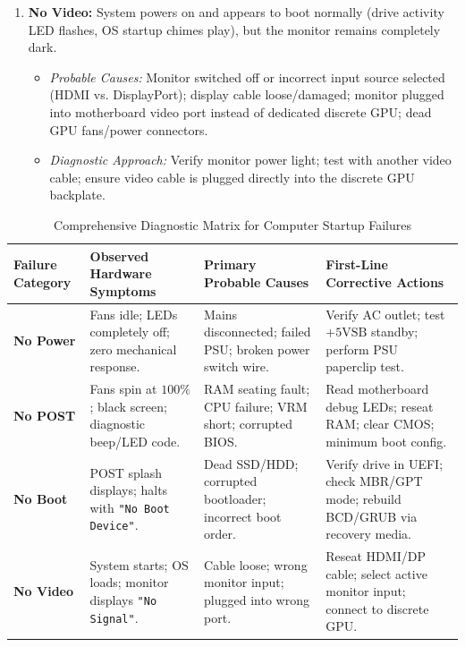 \begin{enumerate}[label=\bfseries\arabic*.]
\begin{itemize}
        \item \textit{Diagnostic Approach:} Enter UEFI Setup; verify if physical SSD is detected under SATA/NVMe drive lists; check boot order priorities; repair Windows BCD or GRUB2 bootloader via recovery USB.
    \end{itemize}
    \item \textbf{No Video:} System powers on and appears to boot normally (drive activity LED flashes, OS startup chimes play), but the monitor remains completely dark.
    \begin{itemize}
        \item \textit{Probable Causes:} Monitor switched off or incorrect input source selected (HDMI vs. DisplayPort); display cable loose/damaged; monitor plugged into motherboard video port instead of dedicated discrete GPU; dead GPU fans/power connectors.
        \item \textit{Diagnostic Approach:} Verify monitor power light; test with another video cable; ensure video cable is plugged directly into the discrete GPU backplate.
    \end{itemize}
\end{enumerate}

\begin{table}[htbp]
\centering
\small
\caption{Comprehensive Diagnostic Matrix for Computer Startup Failures}
\label{tab:startup_troubleshooting_matrix}
\begin{tabularx}{\textwidth}{l X X X}
\toprule
\textbf{Failure Category} & \textbf{Observed Hardware Symptoms} & \textbf{Primary Probable Causes} & \textbf{First-Line Corrective Actions} \\
\midrule
\textbf{No Power} & Fans idle; LEDs completely off; zero mechanical response. & Mains disconnected; failed PSU; broken power switch wire. & Verify AC outlet; test $+5\text{VSB}$ standby; perform PSU paperclip test. \\
\textbf{No POST} & Fans spin at $100\%$; black screen; diagnostic beep/LED code. & RAM seating fault; CPU failure; VRM short; corrupted BIOS. & Read motherboard debug LEDs; reseat RAM; clear CMOS; minimum boot config. \\
\textbf{No Boot} & POST splash displays; halts with \texttt{"No Boot Device"}. & Dead SSD/HDD; corrupted bootloader; incorrect boot order. & Verify drive in UEFI; check MBR/GPT mode; rebuild BCD/GRUB via recovery media. \\
\textbf{No Video} & System starts; OS loads; monitor displays \texttt{"No Signal"}. & Cable loose; wrong monitor input; plugged into wrong port. & Reseat HDMI/DP cable; select active monitor input; connect to discrete GPU. \\
\bottomrule
\end{tabularx}
\end{table}


